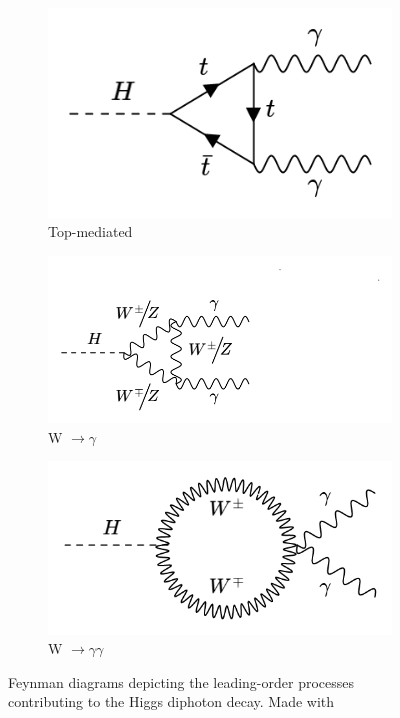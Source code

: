 \begin{figure}[htp]
  \centering
       \begin{subfigure}[b]{0.3\textwidth}
         \centering
         \includegraphics[width=\textwidth]{figures/theory_chapter/toploop.png}
         \caption{Top-mediated}
         \label{fig:toploop}
     \end{subfigure}
     \hfill
         \begin{subfigure}[b]{0.3\textwidth}
         \centering
         \includegraphics[width=\textwidth]{figures/theory_chapter/Wloop1.png}
         \caption{W $\rightarrow \gamma$ }
         \label{fig:Wloop1}
     \end{subfigure}
     \hfill 
        \begin{subfigure}[b]{0.3\textwidth}
         \centering
         \includegraphics[width=\textwidth]{figures/theory_chapter/Wloop2.png}
         \caption{W $\rightarrow \gamma \gamma$}
         \label{fig:Wloop2}
     \end{subfigure}
     \hfill
  \label{fig:loopmodes}
  \caption{Feynman diagrams depicting the leading-order processes contributing to the Higgs diphoton decay. Made with \cite{FeynmanMaker}}  
\end{figure}

